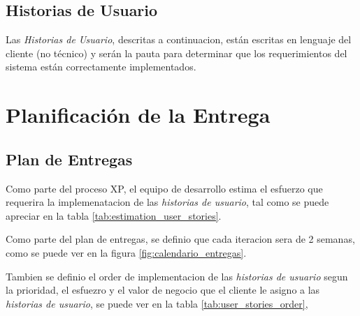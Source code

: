   \subsection{Historias de Usuario}
  \label{sub:historias_de_usuario}

    Las \emph{Historias de Usuario}, descritas a continuacion, están escritas en lenguaje del cliente (no técnico) y serán la pauta para  determinar que los requerimientos del sistema están correctamente implementados.





  \section{Planificación de la Entrega}
  \label{sub:Planificación de la Entrega}


  \subsection{Plan de Entregas}

  Como parte del proceso XP, el equipo de desarrollo estima el esfuerzo que requerira la implemenatacion de las \emph{historias de usuario}, tal como se puede apreciar en la tabla \ref{tab:estimation_user_stories}.




    Como parte del plan de entregas, se definio que cada iteracion sera de 2 semanas, como se puede ver en la figura \ref{fig:calendario_entregas}.




       Tambien se definio el order de implementacion de las  \emph{historias de usuario} segun la  prioridad, el esfuezro y el valor de negocio que el cliente le asigno a las \emph{historias de usuario}, se puede ver en la tabla \ref{tab:user_stories_order},

